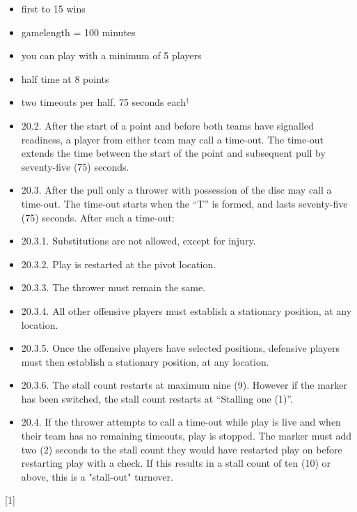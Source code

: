 \small{
    \begin{itemize}
        \item first to 15 wins
        \item gamelength = 100 minutes
        \item you can play with a minimum of 5 players
        \item half time at 8 points
        \item two timeouts per half. 75 seconds each$^\dagger$
        \item 20.2. After the start of a point and before both teams have signalled readiness, a player from either team may call a time-out. The time-out extends the time between the start of the point and subsequent pull by seventy-five (75) seconds.
        \item 20.3. After the pull only a thrower with possession of the disc may call a time-out. The time-out starts when the “T” is formed, and lasts seventy-five (75) seconds. After such a time-out:
        \item 20.3.1. Substitutions are not allowed, except for injury.
        \item 20.3.2. Play is restarted at the pivot location.
        \item 20.3.3. The thrower must remain the same.
        \item 20.3.4. All other offensive players must establish a stationary position, at any location.
        \item 20.3.5. Once the offensive players have selected positions, defensive players must then establish a stationary position, at any location.
        \item 20.3.6. The stall count restarts at maximum nine (9). However if the marker has been switched, the stall count restarts at “Stalling one (1)”.
        \item 20.4. If the thrower attempts to call a time-out while play is live and when their team has no remaining timeouts, play is stopped. The marker must add two (2) seconds to the stall count they would have restarted play on before restarting play with a check. If this results in a stall count of ten (10) or above, this is a "stall-out" turnover.
    \end{itemize}
}


\begin{center}[1]\end{center}
